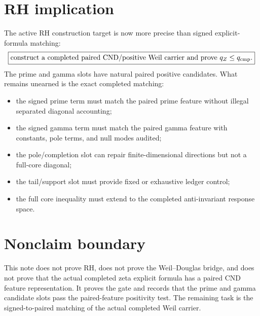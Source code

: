 \documentclass[11pt]{article}
\begin{document}
\section{RH implication}
The active RH construction target is now more precise than signed explicit-formula matching:
\[
  \boxed{\text{construct a completed paired CND/positive Weil carrier and prove }q_Z\le q_{\rm cmp}.}
\]
The prime and gamma slots have natural paired positive candidates.  What remains unearned is the exact completed matching:
\begin{itemize}
\item the signed prime term must match the paired prime feature without illegal separated diagonal accounting;
\item the signed gamma term must match the paired gamma feature with constants, pole terms, and null modes audited;
\item the pole/completion slot can repair finite-dimensional directions but not a full-core diagonal;
\item the tail/support slot must provide fixed or exhaustive ledger control;
\item the full core inequality must extend to the completed anti-invariant response space.
\end{itemize}

\section{Nonclaim boundary}
This note does not prove RH, does not prove the Weil--Douglas bridge, and does not prove that the actual completed zeta explicit formula has a paired CND feature representation.  It proves the gate and records that the prime and gamma candidate slots pass the paired-feature positivity test.  The remaining task is the signed-to-paired matching of the actual completed Weil carrier.
\end{document}
